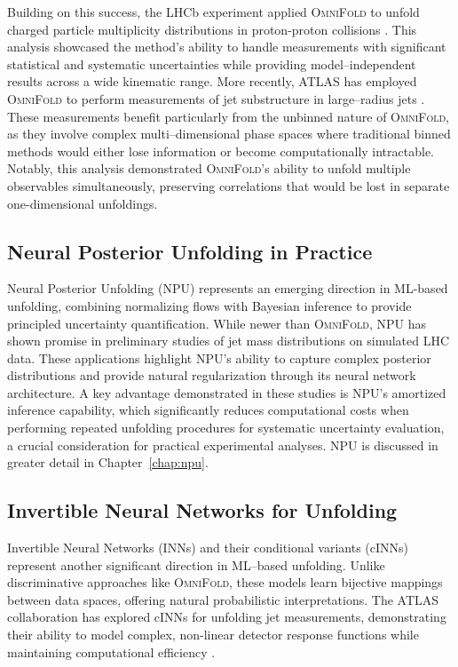     Building on this success, the LHCb experiment applied \textsc{OmniFold} to unfold charged particle multiplicity distributions in proton-proton collisions .
    This analysis showcased the method's ability to handle measurements with significant statistical and systematic uncertainties while providing model--independent results across a wide kinematic range.
    More recently, ATLAS has employed \textsc{OmniFold} to perform measurements of jet substructure in large--radius jets .
    These measurements benefit particularly from the unbinned nature of \textsc{OmniFold}, as they involve complex multi--dimensional phase spaces where traditional binned methods would either lose information or become computationally intractable. 
    Notably, this analysis demonstrated \textsc{OmniFold}'s ability to unfold multiple observables simultaneously, preserving correlations that would be lost in separate one-dimensional unfoldings.

\subsection{Neural Posterior Unfolding in Practice}
    Neural Posterior Unfolding (NPU) represents an emerging direction in ML-based unfolding, combining normalizing flows with Bayesian inference to provide principled uncertainty quantification.
    While newer than \textsc{OmniFold}, NPU has shown promise in preliminary studies of jet mass distributions on simulated LHC data. 
    These applications highlight NPU's ability to capture complex posterior distributions and provide natural regularization through its neural network architecture.
    A key advantage demonstrated in these studies is NPU's amortized inference capability, which significantly reduces computational costs when performing repeated unfolding procedures for systematic uncertainty evaluation, a crucial consideration for practical experimental analyses.
    NPU is discussed in greater detail in Chapter~\ref{chap:npu}.
    
\subsection{Invertible Neural Networks for Unfolding}
    Invertible Neural Networks (INNs) and their conditional variants (cINNs) represent another significant direction in ML--based unfolding.
    Unlike discriminative approaches like \textsc{OmniFold}, these models learn bijective mappings between data spaces, offering natural probabilistic interpretations.
    The ATLAS collaboration has explored cINNs for unfolding jet measurements, demonstrating their ability to model complex, non-linear detector response functions while maintaining computational efficiency .

